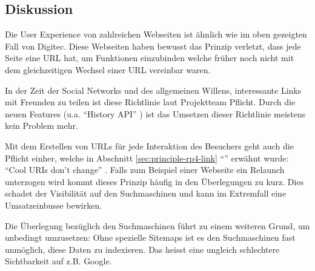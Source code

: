 \subsection*{Diskussion}
Die User Experience von zahlreichen Webseiten ist ähnlich wie im oben gezeigten Fall von Digitec. Diese Webseiten haben bewusst das Prinzip verletzt, dass jede Seite eine \gls{URL} hat, um Funktionen einzubinden welche früher noch nicht mit dem gleichzeitigen Wechsel einer \gls{URL} vereinbar waren.

In der Zeit der Social Networks und des allgemeinen Willens, interessante Links mit Freunden zu teilen ist diese Richtlinie laut Projektteam Pflicht. Durch die neuen Features (u.a. ``History API'' \cite{HistoryAPI}) ist das Umsetzen dieser Richtlinie meistens kein Problem mehr.

Mit dem Erstellen von \glspl{URL} für jede Interaktion des Besuchers geht auch die Pflicht einher, welche in Abschnitt \ref{sec:principle-rp4-link} ``'' erwähnt wurde: ``Cool URIs don't change''  \cite{CoolURIsTBL}. Falls zum Beispiel einer Webseite ein Relaunch unterzogen wird kommt dieses Prinzip häufig in den Überlegungen zu kurz. Dies schadet der Visibilität auf den Suchmaschinen und kann im Extremfall eine Umsatzeinbusse bewirken.

Die Überlegung bezüglich den Suchmaschinen führt zu einem weiteren Grund, um  unbedingt umzusetzen: Ohne spezielle Sitemaps \cite{Sitemap} ist es den Suchmaschinen fast unmöglich, diese Daten zu indexieren. Das heisst eine ungleich schlechtere Sichtbarkeit auf z.B. Google.